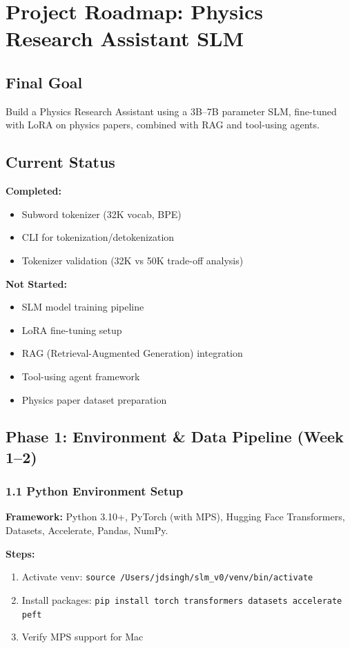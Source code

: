 \documentclass[11pt]{article}
\begin{document}
\appendix

\section{Project Roadmap: Physics Research Assistant SLM}

\subsection{Final Goal}
Build a Physics Research Assistant using a 3B--7B parameter SLM, fine-tuned with LoRA on physics papers, combined with RAG and tool-using agents.

\subsection{Current Status}
\textbf{Completed:}
\begin{itemize}[leftmargin=1.2em]
  \item Subword tokenizer (32K vocab, BPE)
  \item CLI for tokenization/detokenization
  \item Tokenizer validation (32K vs 50K trade-off analysis)
\end{itemize}

\textbf{Not Started:}
\begin{itemize}[leftmargin=1.2em]
  \item SLM model training pipeline
  \item LoRA fine-tuning setup
  \item RAG (Retrieval-Augmented Generation) integration
  \item Tool-using agent framework
  \item Physics paper dataset preparation
\end{itemize}

\subsection{Phase 1: Environment \& Data Pipeline (Week 1--2)}

\subsubsection{1.1 Python Environment Setup}
\textbf{Framework:} Python 3.10+, PyTorch (with MPS), Hugging Face Transformers, Datasets, Accelerate, Pandas, NumPy.

\textbf{Steps:}
\begin{enumerate}[leftmargin=1.5em]
  \item Activate venv: \texttt{source /Users/jdsingh/slm\_v0/venv/bin/activate}
  \item Install packages: \texttt{pip install torch transformers datasets accelerate peft}
  \item Verify MPS support for Mac
\end{enumerate}
\end{document}
